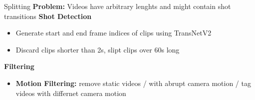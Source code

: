 \documentclass{beamer}
\begin{document}
\begin{frame}[t]{Splitting}
    \textbf{Problem:} Videos have arbitrary lenghts and might contain shot transitions
    \textbf{Shot Detection}
    \begin{itemize}[label=-]
        \item Generate start and end frame indices of clips using TransNetV2
        \item Discard clips shorter than 2s, slipt clips over 60s long %
    \end{itemize}
    \pause
    \textbf{Filtering} %
    \begin{itemize}[label=-]
        \item \textbf{Motion Filtering:} remove static videos / with abrupt camera motion / tag videos with differnet camera motion 
    \end{itemize}
\end{frame}
\end{document}
